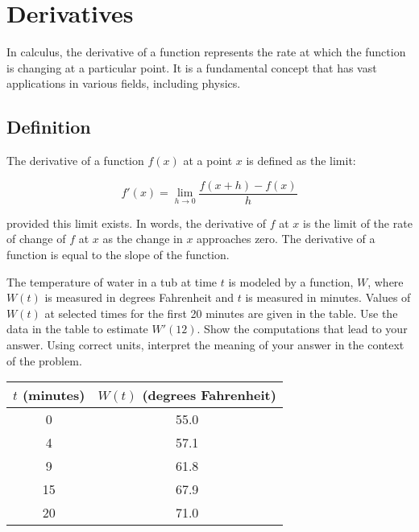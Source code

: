 \chapter{Derivatives}

In calculus, the derivative of a function represents the rate at which the 
function is changing at a particular point. It is a fundamental concept that 
has vast applications in various fields, including physics.

\section{Definition}

The derivative of a function $f(x)$ at a point $x$ is defined as the limit:

\begin{equation}
f'(x) = \lim_{{h \to 0}} \frac{f(x+h) - f(x)}{h}
\end{equation}

provided this limit exists. In words, the derivative of $f$ at $x$ is the 
limit of the rate of change of $f$ at $x$ as the change in $x$ approaches zero. 
The derivative of a function is equal to the slope  of the function. 


\begin{Exercise} The temperature of water in a tub 
	at time $t$ is modeled by a function, $W$, where $W(t)$ is measured in degrees 
	Fahrenheit and $t$ is measured in minutes. Values of $W(t)$ at selected times 
	for the first 20 minutes are given in the table. Use the data in the table to 
	estimate $W'(12)$. Show the computations that lead to your answer. Using 
	correct units, interpret the meaning of your answer in the context of the 
	problem. \\
	\begin{tabular}{c|c}\hline
	$t$ (minutes) & $W(t)$ (degrees Fahrenheit)\\
	\hline
	0 & 55.0\\
	\hline
	4 & 57.1\\
	\hline
	9 & 61.8\\
	\hline
	15 & 67.9\\
	\hline
	20 & 71.0\\
	\hline
	\end{tabular}	 
\end{Exercise}


